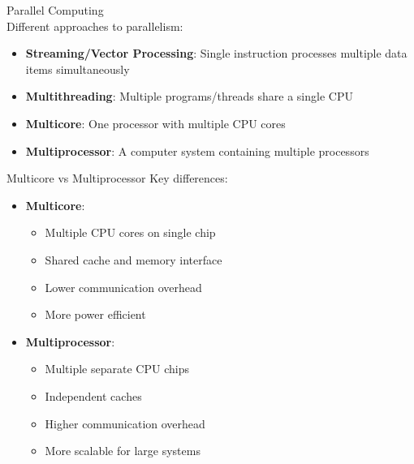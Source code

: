 \begin{concept}{Parallel Computing}\\
Different approaches to parallelism:
\begin{itemize}
  \item \textbf{Streaming/Vector Processing}: Single instruction processes multiple data items simultaneously
  \item \textbf{Multithreading}: Multiple programs/threads share a single CPU
  \item \textbf{Multicore}: One processor with multiple CPU cores
  \item \textbf{Multiprocessor}: A computer system containing multiple processors
\end{itemize}
\end{concept}

\begin{example2}{Multicore vs Multiprocessor}
Key differences:
\begin{itemize}
  \item \textbf{Multicore}:
    \begin{itemize}
      \item Multiple CPU cores on single chip
      \item Shared cache and memory interface
      \item Lower communication overhead
      \item More power efficient
    \end{itemize}
  \item \textbf{Multiprocessor}:
    \begin{itemize}
      \item Multiple separate CPU chips
      \item Independent caches
      \item Higher communication overhead
      \item More scalable for large systems
    \end{itemize}
\end{itemize}
\end{example2}


